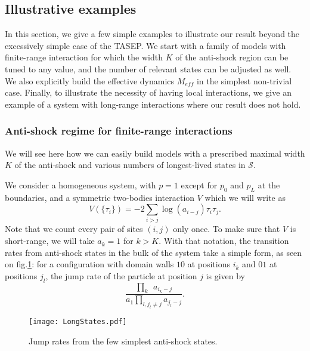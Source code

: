 \documentclass[aps,pre,onecolumn,showpacs,showkeys,a4paper]{revtex4-1}
\begin{document}
\subsection{Illustrative examples}
\label{IVd}

In this section, we give a few simple examples to illustrate our result beyond the excessively simple case of the TASEP. We start with a family of models with finite-range interaction for which the width $K$ of the anti-shock region can be tuned to any value, and the number of relevant states can be adjusted as well. We also explicitly build the effective dynamics $M_{eff}$ in the simplest non-trivial case. Finally, to illustrate the necessity of having local interactions, we give an example of a system with long-range interactions where our result does not hold.

\subsubsection{Anti-shock regime for finite-range interactions}
\label{IVd1}

We will see here how we can easily build models with a prescribed maximal width $K$ of the anti-shock and various numbers of longest-lived states in $\mathcal{S}$.

We consider a homogeneous system, with $p=1$ except for $p_0$ and $p_L$ at the boundaries, and a symmetric two-bodies interaction $V$ which we will write as
\begin{equation}
V(\{\tau_i\})=-2\sum\limits_{i>j}\log(a_{i-j})\tau_i \tau_j.
\end{equation}
Note that we count every pair of sites $(i,j)$ only once. To make sure that $V$ is short-range, we will take $a_k=1$ for $k>K$. With that notation, the transition rates from anti-shock states in the bulk of the system take a simple form, as seen on fig.\ref{fig-LongStates}: for a configuration with domain walls $10$ at positions $i_k$ and $01$ at positions $j_l$, the jump rate of the particle at position $j$ is given by
\begin{equation}
\frac{\prod\limits_{k}~~a_{i_k-j}}{a_1\prod\limits_{l, j_l\neq j}a_{j_l-j}}.
\end{equation}

 \begin{figure}[ht]
\begin{center}
 \texttt{[image: LongStates.pdf]}
  \caption{Jump rates from the few simplest anti-shock states.}
\label{fig-LongStates}
 \end{center}
 \end{figure}
\end{document}
